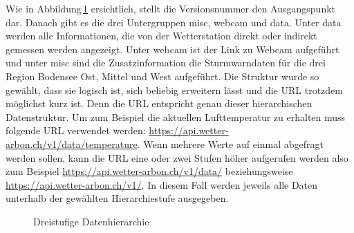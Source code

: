 \begin{itemize*}
\item
\item
\item
\end{itemize*}

Wie in Abbildung\,\ref{img:hierarchie} ersichtlich, stellt die Versionsnummer den Ausgangspunkt dar. Danach gibt es die drei Untergruppen misc, webcam und data. Unter data werden alle Informationen, die von der Wetterstation direkt oder indirekt gemessen werden angezeigt. Unter webcam ist der Link zu Webcam aufgeführt und unter misc sind die Zusatzinformation die Sturmwarndaten für die drei Region Bodensee Ost, Mittel und West aufgeführt. Die Struktur wurde so gewählt, dass sie logisch ist, sich beliebig erweitern lässt und die URL trotzdem möglichst kurz ist. Denn die URL entspricht genau dieser hierarchischen Datenstruktur. Um zum Beispiel die aktuellen Lufttemperatur zu erhalten muss folgende URL verwendet werden: \url{https://api.wetter-arbon.ch/v1/data/temperature}. Wenn mehrere Werte auf einmal abgefragt werden sollen, kann die URL eine oder zwei Stufen höher aufgerufen werden also zum Beispiel \url{https://api.wetter-arbon.ch/v1/data/} beziehungsweise \url{https://api.wetter-arbon.ch/v1/}. In diesem Fall werden jeweils alle Daten unterhalb der gewählten Hierarchiestufe ausgegeben.


\begin{figure}[htbp!]
	\centering
	\caption{Dreistufige Datenhierarchie}
	\label{img:hierarchie}
\end{figure}





